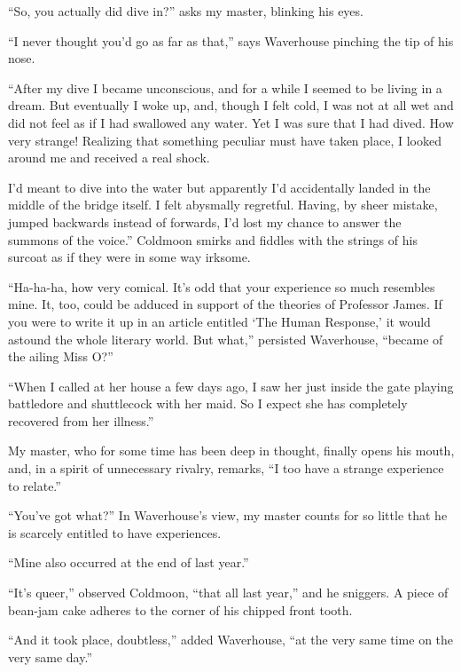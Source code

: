 \documentclass{book}
\begin{document}
``So, you actually did dive in?'' asks my master, blinking his eyes.

``I never thought you'd go as far as that,'' says Waverhouse pinching
the tip of his nose.

``After my dive I became unconscious, and for a while I seemed to be
living in a dream. But eventually I woke up, and, though I felt cold, I
was not at all wet and did not feel as if I had swallowed any water. Yet
I was sure that I had dived. How very strange! Realizing that something
peculiar must have taken place, I looked around me and received a real
shock.

I'd meant to dive into the water but apparently I'd accidentally landed
in the middle of the bridge itself. I felt abysmally regretful. Having,
by sheer mistake, jumped backwards instead of forwards, I'd lost my
chance to answer the summons of the voice.'' Coldmoon smirks and fiddles
with the strings of his surcoat as if they were in some way irksome.

``Ha-ha-ha, how very comical. It's odd that your experience so much
resembles mine. It, too, could be adduced in support of the theories of
Professor James. If you were to write it up in an article entitled `The
Human Response,' it would astound the whole literary world. But what,''
persisted Waverhouse, ``became of the ailing Miss O?''

``When I called at her house a few days ago, I saw her just inside the
gate playing battledore and shuttlecock with her maid. So I expect she
has completely recovered from her illness.''

My master, who for some time has been deep in thought, finally opens his
mouth, and, in a spirit of unnecessary rivalry, remarks, ``I too have a
strange experience to relate.''

``You've got what?'' In Waverhouse's view, my master counts for so
little that he is scarcely entitled to have experiences.

``Mine also occurred at the end of last year.''

``It's queer,'' observed Coldmoon, ``that all last year,'' and he
sniggers. A piece of bean-jam cake adheres to the corner of his chipped
front tooth.

``And it took place, doubtless,'' added Waverhouse, ``at the very same
time on the very same day.''
\end{document}
